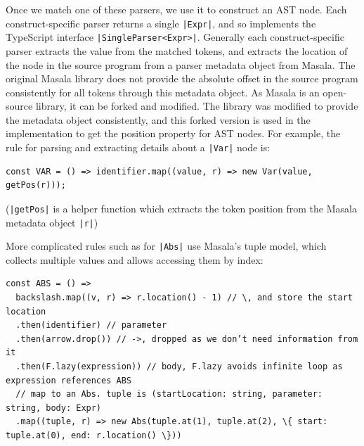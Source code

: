 \documentclass[a4paper,fleqn,12pt]{article}
\begin{document}
Once we match one of these parsers, we use it to construct an AST node. Each construct-specific parser returns a single \texttt{|Expr|}, and so implements the TypeScript interface \texttt{|SingleParser<Expr>|}. Generally each construct-specific parser extracts the value from the matched tokens, and extracts the location of the node in the source program from a parser metadata object from Masala. The original Masala library does not provide the absolute offset in the source program consistently for all tokens through this metadata object. As Masala is an open-source library, it can be forked and modified. The library was modified to provide the metadata object consistently, and this forked version is used in the implementation to get the position property for AST nodes. For example, the rule for parsing and extracting details about a \texttt{|Var|} node is:

\begin{verbatim}
const VAR = () => identifier.map((value, r) => new Var(value, getPos(r)));
\end{verbatim}

(\texttt{|getPos|} is a helper function which extracts the token position from the Masala metadata object \texttt{|r|})

More complicated rules such as for \texttt{|Abs|} use Masala’s tuple model, which collects multiple values and allows accessing them by index:

\begin{verbatim}
const ABS = () =>
  backslash.map((v, r) => r.location() - 1) // \, and store the start location
  .then(identifier) // parameter
  .then(arrow.drop()) // ->, dropped as we don’t need information from it
  .then(F.lazy(expression)) // body, F.lazy avoids infinite loop as expression references ABS
  // map to an Abs. tuple is (startLocation: string, parameter: string, body: Expr)
  .map((tuple, r) => new Abs(tuple.at(1), tuple.at(2), \{ start: tuple.at(0), end: r.location() \}))
\end{verbatim}
\end{document}
